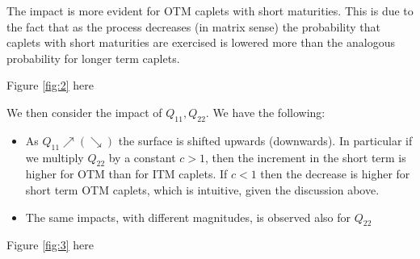 The impact is more evident for OTM caplets with short maturities. This is due to the fact that as the process decreases (in matrix sense) the probability that caplets with short maturities are exercised is lowered more than the analogous probability for longer term caplets.
\begin{center}
Figure \eqref{fig:2}  here
\end{center}
We then consider the impact of $Q_{11},Q_{22}$. We have the following:
\begin{itemize}
\item As $Q_{11}\nearrow(\searrow)$ the surface is shifted upwards (downwards). In particular if we multiply $Q_{22}$ by a constant $c>1$, then the increment in the short term is higher for OTM than for ITM caplets. If $c<1$ then the decrease is higher for short term OTM caplets, which is intuitive, given the discussion above.
\item The same impacts, with different magnitudes, is observed also for $Q_{22}$
\end{itemize}
\begin{center}
Figure \eqref{fig:3}  here
\end{center}


